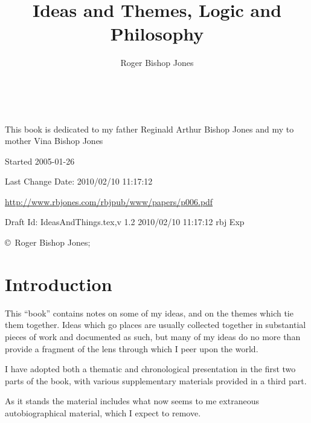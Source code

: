 \documentclass[10pt,titlepage]{book}
\title{Ideas and Themes, Logic and Philosophy}
\author{Roger Bishop Jones}
\date{\ }
\begin{document}
\frontmatter

\begin{titlepage}
\maketitle

\vfill


\begin{centering}

{\parskip=0.3in
This book is dedicated to my father
\vfil
{ Reginald Arthur Bishop Jones}
\vfil
and my to mother
\vfil
{ Vina Bishop Jones}
}

\vfill

\footnotesize{
Started 2005-01-26

Last Change $ $Date: 2010/02/10 11:17:12 $ $

\href{http://www.rbjones.com/rbjpub/www/papers/p006.pdf}{http://www.rbjones.com/rbjpub/www/papers/p006.pdf}

Draft $ $Id: IdeasAndThings.tex,v 1.2 2010/02/10 11:17:12 rbj Exp $ $

\copyright\ Roger Bishop Jones;

}%
\end{centering}

\thispagestyle{empty}
\end{titlepage}

{\parskip=0pt\tableofcontents}


\mainmatter
\chapter{Introduction}

This ``book'' contains notes on some of my ideas, and on the themes which tie them together.
Ideas which go places are usually collected together in substantial pieces of work and documented as such, but many of my ideas do no more than provide a fragment of the lens through which I peer upon the world.

I have adopted both a thematic and chronological presentation in the first two parts of the book, with various supplementary materials provided in a third part.

As it stands the material includes what now seems to me extraneous autobiographical material, which I expect to remove.
\end{document}
